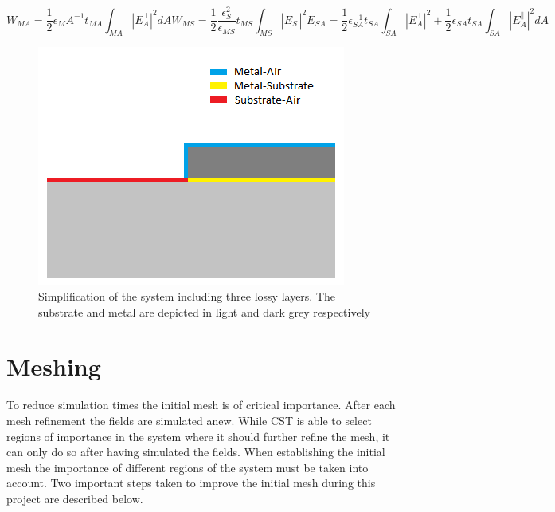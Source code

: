 \begin{subequations}\label{eq:LossyLayerEnergy}
	\begin{equation} \label{eq:LossyLayerEnergyA}
	W_{MA} =\frac{1}{2}\epsilon_MA^{-1}t_{MA}\int_{MA}^{}|E_{A}^{\bot}|^{2}dA
	\end{equation}	
	\begin{equation} \label{eq:LossyLayerEnergyB}
	W_{MS} = \frac{1}{2}\frac{\epsilon_{S}^{2}}{\epsilon_{MS}}t_{MS}\int_{MS}^{}|E_{S}^{\bot}|^{2} 
	\end{equation}
	\begin{equation}\label{eq:LossyLayerEnergyC}
	E_{SA} = \frac{1}{2}\epsilon_{SA}^{-1}t_{SA}\int_{SA}^{}|E_{A}^{\bot}|^{2} +\frac{1}{2} \epsilon_{SA}t_{SA}\int_{SA}^{}|E_{A}^{\parallel}|^{2}dA
	\end{equation}
\end{subequations}

\begin{figure}
	\begin{center}
		\includegraphics[scale=.8]{Figures/model}
		\caption{Simplification of the system including three lossy layers. The substrate and metal are depicted in light and dark grey respectively}
		\label{fig:model}
	\end{center}
\end{figure}



\section{Meshing}
To reduce simulation times the initial mesh is of critical importance. After each mesh refinement the fields are simulated anew. While CST is able to select regions of importance in the system where it should further refine the mesh, it can only do so after having simulated the fields. When establishing the initial mesh the importance of different regions of the system must be taken into account. Two  important steps taken to improve the initial mesh during this project are described below.   


